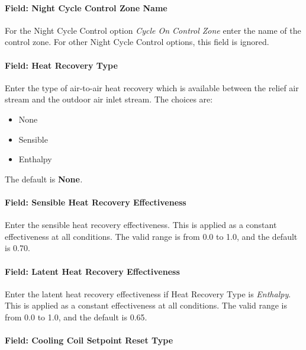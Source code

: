 \paragraph{Field: Night Cycle Control Zone Name}\label{field-night-cycle-control-zone-name-2}

For the Night Cycle Control option \emph{Cycle On Control Zone} enter the name of the control zone. For other Night Cycle Control options, this field is ignored.

\paragraph{Field: Heat Recovery Type}\label{field-heat-recovery-type-4}

Enter the type of air-to-air heat recovery which is available between the relief air stream and the outdoor air inlet stream. The choices are:

\begin{itemize}
\item
  None
\item
  Sensible
\item
  Enthalpy
\end{itemize}

The default is \textbf{None}\emph{.}

\paragraph{Field: Sensible Heat Recovery Effectiveness}\label{field-sensible-heat-recovery-effectiveness-4}

Enter the sensible heat recovery effectiveness. This is applied as a constant effectiveness at all conditions. The valid range is from 0.0 to 1.0, and the default is 0.70.

\paragraph{Field: Latent Heat Recovery Effectiveness}\label{field-latent-heat-recovery-effectiveness-4}

Enter the latent heat recovery effectiveness if Heat Recovery Type is \emph{Enthalpy}. This is applied as a constant effectiveness at all conditions. The valid range is from 0.0 to 1.0, and the default is 0.65.

\paragraph{Field: Cooling Coil Setpoint Reset Type}\label{field-cooling-coil-setpoint-reset-type}

